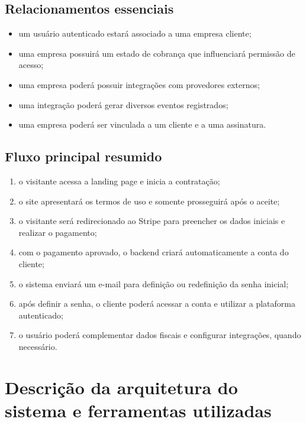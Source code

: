 \documentclass[
  12pt,
  openany,
  oneside,
  a4paper,
  brazil
]{abntex2}
\begin{document}
\section{Relacionamentos essenciais}
\begin{itemize}
  \item um usu\'ario autenticado estar\'a associado a uma empresa cliente;
  \item uma empresa possuir\'a um estado de cobran\c{c}a que influenciar\'a permiss\~ao de acesso;
  \item uma empresa poder\'a possuir integra\c{c}\~oes com provedores externos;
  \item uma integra\c{c}\~ao poder\'a gerar diversos eventos registrados;
  \item uma empresa poder\'a ser vinculada a um cliente e a uma assinatura.
\end{itemize}

\section{Fluxo principal resumido}
\begin{enumerate}
  \item o visitante acessa a landing page e inicia a contrata\c{c}\~ao;
  \item o site apresentar\'a os termos de uso e somente prosseguir\'a ap\'os o aceite;
  \item o visitante ser\'a redirecionado ao Stripe para preencher os dados iniciais e realizar o pagamento;
  \item com o pagamento aprovado, o backend criar\'a automaticamente a conta do cliente;
  \item o sistema enviar\'a um e-mail para defini\c{c}\~ao ou redefini\c{c}\~ao da senha inicial;
  \item ap\'os definir a senha, o cliente poder\'a acessar a conta e utilizar a plataforma autenticado;
  \item o usu\'ario poder\'a complementar dados fiscais e configurar integra\c{c}\~oes, quando necess\'ario.
\end{enumerate}

\chapter{Descri\c{c}\~ao da arquitetura do sistema e ferramentas utilizadas}
\end{document}
